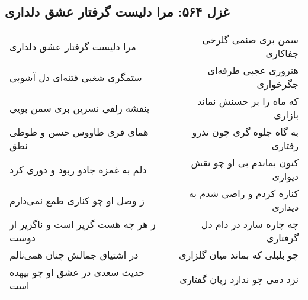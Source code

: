\begin{center}
\section*{غزل ۵۶۴: مرا دلیست گرفتار عشق دلداری}
\label{sec:564}
\begin{longtable}{l p{0.5cm} r}
مرا دلیست گرفتار عشق دلداری
&&
سمن بری صنمی گلرخی جفاکاری
\\
ستمگری شغبی فتنه‌ای دل آشوبی
&&
هنروری عجبی طرفه‌ای جگرخواری
\\
بنفشه زلفی نسرین بری سمن بویی
&&
که ماه را بر حسنش نماند بازاری
\\
همای فری طاووس حسن و طوطی نطق
&&
به گاه جلوه گری چون تذرو رفتاری
\\
دلم به غمزه جادو ربود و دوری کرد
&&
کنون بماندم بی او چو نقش دیواری
\\
ز وصل او چو کناری طمع نمی‌دارم
&&
کناره کردم و راضی شدم به دیداری
\\
ز هر چه هست گزیر است و ناگزیر از دوست
&&
چه چاره سازد در دام دل گرفتاری
\\
در اشتیاق جمالش چنان همی‌نالم
&&
چو بلبلی که بماند میان گلزاری
\\
حدیث سعدی در عشق او چو بیهده ا‌ست
&&
نزد دمی چو ندارد زبان گفتاری
\\
\end{longtable}
\end{center}
